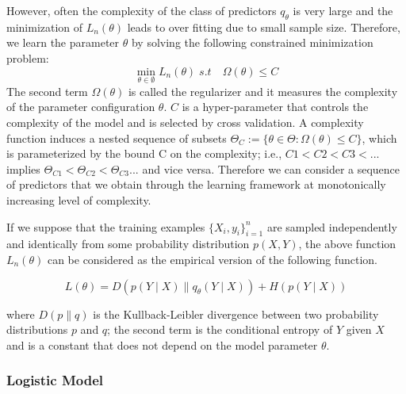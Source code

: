 However, often the complexity of the class of predictors $q_\theta$  is very large and the minimization of $L_n (\theta)$ leads to over fitting due to small sample size. Therefore, we learn the parameter $\theta$ by solving the following constrained minimization problem: 
\begin{equation}\label{eq44}
\min_{\theta\in\emptyset}L_n\left(\theta\right)\; s.t\quad \Omega\left(\theta\right)\leq C
\end{equation}
The second term $\Omega (\theta)$ is called the regularizer and it measures the complexity of the parameter configuration $\theta$. $C$ is a hyper-parameter that controls the complexity of the model and is selected by cross validation. A complexity function induces a nested sequence of subsets                   $\Theta_C :=\lbrace \theta \in \Theta: \Omega (\theta) \leq C\rbrace $, which is parameterized by the bound C on the complexity; i.e., $C1< C2 <C3 < ...$ implies $\Theta_{C1}<\Theta_{C2}<\Theta_{C3}...$ and vice versa. Therefore we can consider a sequence of predictors that we obtain through the learning framework at monotonically increasing level of complexity.
               
If we suppose that the training examples $\lbrace X_i,y_i\rbrace_{i=1}^n$ are sampled independently and identically from some probability distribution $p(X, Y)$, the above function $L_n(\theta)$ can be considered as the empirical version of the following function.
 
\begin{equation}
L\left(\theta\right)=D\left(p\left(Y\mid X\right)\parallel q_\theta\left(Y\mid X\right)\right) + H\left(p\left(Y\mid X\right)\right)
\end{equation}

where $D(p \parallel q)$ is the Kullback-Leibler divergence between two probability distributions $p$ and $q$; the second term is the conditional entropy of $Y$ given $X$ and is a constant that does not depend on the model parameter $\theta$.

\subsubsection{Logistic Model}

